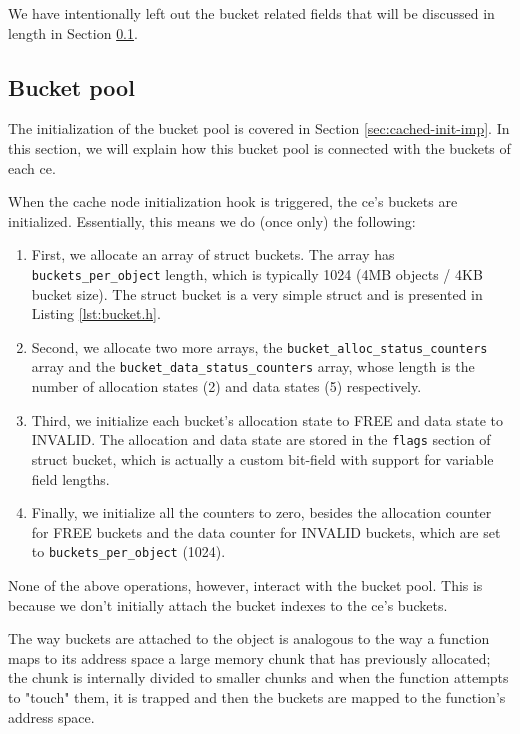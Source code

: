 We have intentionally left out the bucket related fields that will be discussed 
in length in Section \ref{sec:cached-bucket-imp}.

\subsection{Bucket pool}\label{sec:cached-bucket-imp}

The initialization of the bucket pool is covered in Section 
\ref{sec:cached-init-imp}. In this section, we will explain how this bucket 
pool is connected with the buckets of each ce.

When the cache node initialization hook is triggered, the ce's buckets are 
initialized. Essentially, this means we do (once only) the following:

\begin{enumerate}
	\item First, we allocate an array of struct buckets. The array has
		\texttt{buckets\_per\_object} length, which is typically 1024 
		(4MB objects / 4KB bucket size). The struct bucket is a very 
		simple struct and is presented in Listing 
		\ref{lst:bucket.h}.
		

	\item Second, we allocate two more arrays, the  
		\texttt{bucket\_alloc\_status\_counters} array and the
		\texttt{bucket\_data\_status\_counters} array, whose length is 
		the number of allocation states (2) and data states (5) 
		respectively.
	\item Third, we initialize each bucket's allocation state to FREE and 
		data state to INVALID. The allocation and data state are stored 
		in the \texttt{flags} section of struct bucket, which is 
		actually a custom bit-field with support for variable field 
		lengths.
	\item Finally, we initialize all the counters to zero, besides the 
		allocation counter for FREE buckets and the data counter for 
		INVALID buckets, which are set to \texttt{buckets\_per\_object} 
		(1024).
\end{enumerate}

None of the above operations, however, interact with the bucket pool. This is 
because we don't initially attach the bucket indexes to the ce's buckets.

The way buckets are attached to the object is analogous to the way a function 
maps to its address space a large memory chunk that has previously allocated; 
the chunk is internally divided to smaller chunks and when the function 
attempts to "touch" them, it is trapped and then the buckets are mapped to the 
function's address space.

